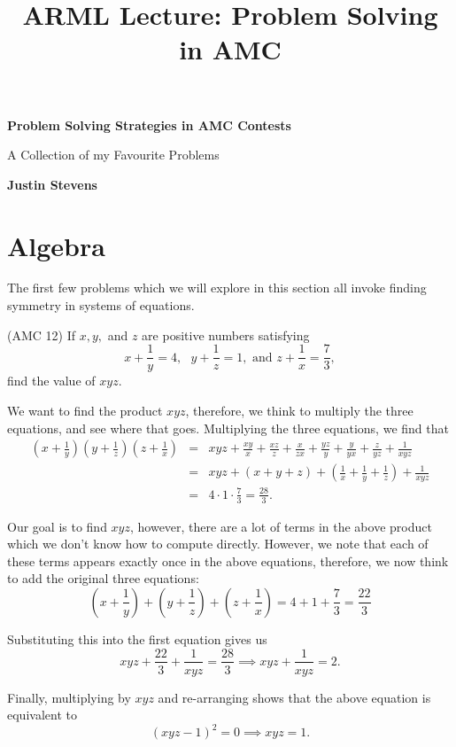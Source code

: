 

\title{ARML Lecture:  Problem Solving in AMC}

	
\thispagestyle{empty}
	
    \begin{center}
    	\vspace*{1cm}
    	
    	\Huge
    	\textbf{Problem Solving Strategies in AMC Contests}
    	
    	\vspace{0.5cm}
    	\LARGE
    	A Collection of my Favourite Problems
    	
    	\vspace{1.5cm}
    	
    	\textbf{Justin Stevens}
    
    	
  
    	
    \end{center}

\section{Algebra}

The first few problems which we will explore in this section all invoke finding symmetry in systems of equations.  
\begin{exmp}(AMC 12)  If $x,y,$ and $z$ are positive numbers satisfying $$x+\frac{1}{y}=4, \text{ } y+\frac{1}{z}=1, \text{ and } z+\frac{1}{x}=\frac{7}{3},$$ find the value of $xyz$.  \end{exmp} 
\begin{soln}  We want to find the product $xyz$, therefore, we think to multiply the three equations, and see where that goes.  Multiplying the three equations, we find that \begin{eqnarray*}\left(x+\frac{1}{y}\right)\left(y+\frac{1}{z}\right)\left(z+\frac{1}{x}\right)&=&xyz+\frac{xy}{x}+\frac{xz}{z}+\frac{x}{zx}+\frac{yz}{y}+\frac{y}{yx}+\frac{z}{yz}+\frac{1}{xyz} \\ &=& xyz+\left(x+y+z\right)+\left(\frac{1}{x}+\frac{1}{y}+\frac{1}{z}\right)+\frac{1}{xyz} \\ &=& 4\cdot 1 \cdot \frac73=\frac{28}{3}. \end{eqnarray*}  

Our goal is to find $xyz$, however, there are a lot of terms in the above product which we don't know how to compute directly.  However, we note that each of these terms appears exactly once in the above equations, therefore, we now think to add the original three equations: $$\left(x+\frac{1}{y}\right)+\left(y+\frac{1}{z}\right)+\left(z+\frac{1}{x}\right)=4+1+\frac{7}{3}=\frac{22}{3}$$

Substituting this into the first equation gives us $$xyz+\frac{22}{3}+\frac{1}{xyz}=\frac{28}{3}\implies xyz+\frac{1}{xyz}=2.$$

Finally, multiplying by $xyz$ and re-arranging shows that the above equation is equivalent to $$(xyz-1)^2=0\implies xyz=\boxed{1}.$$

\end{soln} 

